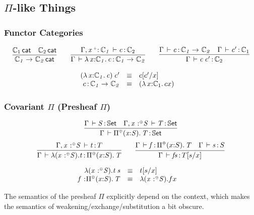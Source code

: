 \documentclass[11pt]{article}
\theoremstyle{plain}
\begin{document}
\subsection{$\Pi$-like Things}

\subsubsection{Functor Categories}

\[
\begin{array}{c}
\infer{\wfdtp{\arr{\C_1}{\C_2}}}
      {\wfdtp{\C_1} &
        \wfdtp{\C_2}}
\qquad
\infer{\ofdtp{\Gamma}{\lam{x}{\C_1}{c}}{\arr {\C_1} {\C_2}}}
      {\ofdtp{\Gamma,\vptptm{x}{\co}{\C_1}}{c}{\C_2}}
\qquad
\infer{\ofdtp{\Gamma}{\app c {c'}}{\C_2}}
      {\ofdtp{\Gamma}{c}{\arr{\C_1}{\C_2}} &
        \ofdtp{\Gamma}{c'}{\C_1}}
\end{array}
\]

\[
\begin{array}{rcll}
\mathit{({\lambda\,x \mathit{:} \mathbb{C}_1.\,c}) \: c'} & \equiv & c [ c' / x ] \\
c \, \mathit{:} \, \mathit{\mathbb{C}_1}\rightarrow_{\mathit{}} \mathit{\mathbb{C}_2} & \equiv & {({\lambda\,x \mathit{:} \mathbb{C}_1.\,c}{x})} &
\end{array} \\
\]

\subsubsection{Covariant $\Pi$ (Presheaf $\Pi$)}
\begin{equation}
	\infer{
		\oftp{\Gamma}{\pico{x}{S}{T}}{\types}
	}{
		\oftp{\Gamma}{S}{\types} &
		\oftp{\Gamma, \tpvar x \coc S}{T}{\types}
	}
\end{equation}
\begin{equation}
	\infer{
		\oftp{\Gamma}{\laco x S t}{\pico{x}{S}{T}}
	}{
		\oftp{\Gamma, \tpvar x \coc S}{t}{T}
	}
	\qquad
	\infer{
		\oftp{\Gamma}{f s}{T[s/x]}
	}{
		\oftp{\Gamma}{f}{\pico{x}{S}{T}} &
		\oftp{\Gamma}{s}{S}
	}
\end{equation}

\[
\begin{array}{rcll}
\mathit{\lambda(\mathit{x} \,^{\,}{:}^{{\text{\tiny $\mathord{\oplus}$}}} \mathit{S}).t \: s} & \equiv & t [ s / x ] \\
\mathit{f} \,^{\,}{:}^{} \mathit{\textnormal{$\Pi$}^{{\text{\tiny $\mathord{\oplus}$}}}(x \mathit{:} S).\,\mathit{T}} & \equiv & \lambda(\mathit{x} \,^{\,}{:}^{{\text{\tiny $\mathord{\oplus}$}}} \mathit{S}).fx &
\end{array} \\
\]

The semantics of the presheaf $\Pi$ explicitly depend on the context, which makes the semantics of weakening/exchange/substitution a bit obscure.
\end{document}
